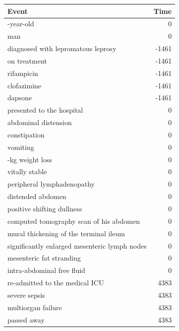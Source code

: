 \begin{ChSixUncaptionedFigure}
\begin{ChSixFloatBody}
\begin{tcolorbox}[
  enhanced,
  colback=gray!4,
  colframe=gray!35,
  boxrule=0.4pt,
  arc=2mm,
  left=3mm,right=3mm,top=2mm,bottom=2mm,
]
\begin{minipage}[t]{0.49\textwidth}\vspace{0pt}
\begin{tcolorbox}[ChSix/annobox,title={Manual annotation}]
\ChSixAnnotationTableStyle
\begin{tabular}{>{\raggedright\arraybackslash}p{} r}
\toprule
\textbf{Event} & \textbf{Time} \\
\midrule
57-year-old&0 \\
man&0 \\
diagnosed with lepromatous leprosy&-1461 \\
on treatment&-1461 \\
rifampicin&-1461 \\
clofazimine&-1461 \\
dapsone&-1461 \\
presented to the hospital&0 \\
abdominal distension&0 \\
constipation&0 \\
vomiting&0 \\
10-kg weight loss&0 \\
vitally stable&0 \\
peripheral lymphadenopathy&0 \\
distended abdomen&0 \\
positive shifting dullness&0 \\
computed tomography scan of his abdomen&0 \\
mural thickening of the terminal ileum&0 \\
significantly enlarged mesenteric lymph nodes&0 \\
mesenteric fat stranding&0 \\
intra-abdominal free fluid&0 \\
re-admitted to the medical ICU&4383 \\
severe sepsis&4383 \\
multiorgan failure&4383 \\
passed away&4383 \\
\bottomrule
\end{tabular}
\end{tcolorbox}
\end{minipage}
\hfill
\begin{minipage}[t]{0.49\textwidth}\vspace{0pt}


\end{minipage}
\end{tcolorbox}
\end{ChSixFloatBody}
\end{ChSixUncaptionedFigure}
